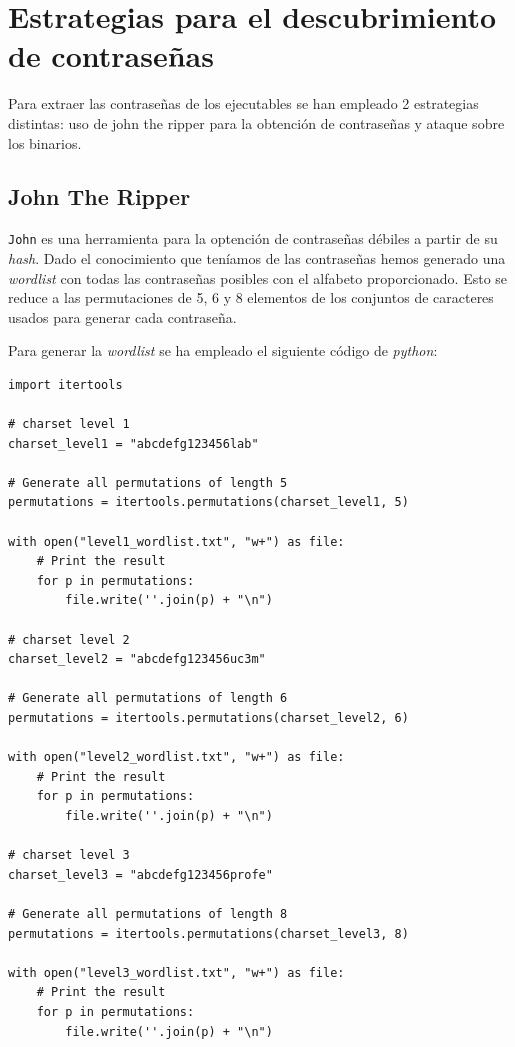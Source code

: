 \documentclass[]{article}
\begin{document}
\section{Estrategias para el descubrimiento de contraseñas}
\label{sec:password}

Para extraer las contraseñas de los ejecutables se han empleado 2 estrategias distintas: uso de john the ripper para la obtención de contraseñas y ataque sobre los binarios.

\subsection{John The Ripper}
\label{sec:john}

\texttt{John} es una herramienta para la optención de contraseñas débiles a partir de su \textit{hash}. Dado el conocimiento que teníamos de las contraseñas hemos generado una \textit{wordlist} con todas las contraseñas posibles con el alfabeto proporcionado. Esto se reduce a las permutaciones de 5, 6 y 8 elementos de los conjuntos de caracteres usados para generar cada contraseña. 

Para generar la \textit{wordlist} se ha empleado el siguiente código de \textit{python}:

\begin{verbatim}
import itertools

# charset level 1
charset_level1 = "abcdefg123456lab"

# Generate all permutations of length 5
permutations = itertools.permutations(charset_level1, 5)

with open("level1_wordlist.txt", "w+") as file:
    # Print the result
    for p in permutations:
        file.write(''.join(p) + "\n")
        
# charset level 2
charset_level2 = "abcdefg123456uc3m"

# Generate all permutations of length 6
permutations = itertools.permutations(charset_level2, 6)

with open("level2_wordlist.txt", "w+") as file:
    # Print the result
    for p in permutations:
        file.write(''.join(p) + "\n")

# charset level 3
charset_level3 = "abcdefg123456profe"

# Generate all permutations of length 8
permutations = itertools.permutations(charset_level3, 8)

with open("level3_wordlist.txt", "w+") as file:
    # Print the result
    for p in permutations:
        file.write(''.join(p) + "\n")

\end{verbatim}
\end{document}
